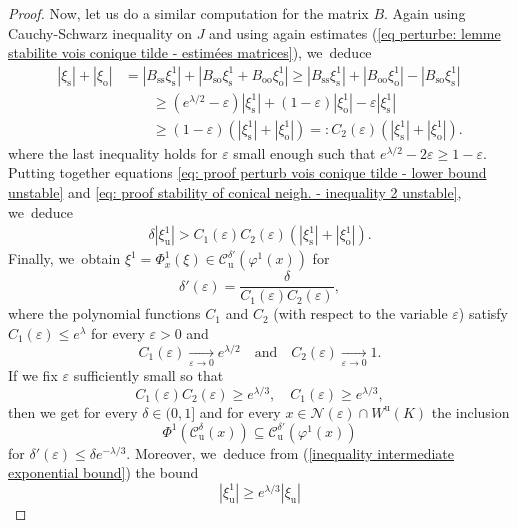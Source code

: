\documentclass[11pt]{article}
\newcommand{\ro}{\mathrm{o}}
\newcommand{\rs}{\mathrm{s}}
\newcommand{\rso}{\mathrm{so}}
\newcommand{\ru}{\mathrm{u}}
\theoremstyle{definition}
\theoremstyle{plain}
\newcommand{\Ccal}{\mathcal{C}}
\newcommand{\Ncal}{\mathcal{N}}
\begin{document}
\begin{proof}
Now, let us do a similar computation for the matrix $B$.
Again using Cauchy-Schwarz inequality on $J$ and using again estimates (\ref{eq perturbe: lemme stabilite vois conique tilde - estimées matrices}), we~deduce
\begin{equation}\label{eq: proof stability of conical neigh. - inequality 2 unstable}
\begin{split}
|\xi_\rs| + |\xi_\ro| &= | B_{\rs\rs} \xi_\rs^1 | + |B_{\rso} \xi_\rs^1 + B_{\ro\ro} \xi_\ro^1 | \geq |B_{\rs\rs} \xi_\rs^1| + |B_{\ro\ro} \xi_\ro^1| - |B_{\rso} \xi_\rs^1| \\
&\qquad \geq (e^{\lambda/2} -\varepsilon) |\xi_\rs^1| + (1 - \varepsilon)|\xi_\ro^1| - \varepsilon |\xi_\rs^1| \\
&\qquad \geq (1 - \varepsilon)(|\xi_\rs^1| + |\xi_\ro^1|) =: C_2 (\varepsilon) (|\xi_\rs^1| + |\xi_\ro^1|).
\end{split}
\end{equation}
where the last inequality holds for $\varepsilon$ small enough such that $e^{\lambda/2} - 2 \varepsilon \geq 1 - \varepsilon$.
Putting together equations \eqref{eq: proof perturb vois conique tilde - lower bound unstable} and \eqref{eq: proof stability of conical neigh. - inequality 2 unstable}, we~deduce
\begin{align*}
\delta|\xi_\ru^1| > C_1 (\varepsilon) C_2 (\varepsilon) (|\xi_\rs^1| + |\xi_\ro^1|).
\end{align*}
Finally, we~obtain $\xi^1 = \Phi_x^1 (\xi) \in \Ccal_\ru^{\delta'}(\varphi^1 (x))$ for
\[
\delta'(\varepsilon) = \frac{\delta }{C_1 (\varepsilon) C_2 (\varepsilon)},
\]
where the polynomial functions $C_1$ and $C_2$ (with respect to the variable $\varepsilon$) satisfy $C_1 (\varepsilon) \leq e^{\lambda}$ for every $\varepsilon >0$ and
\[
C_1 (\varepsilon) \underset{\varepsilon \to 0}{\to} e^{\lambda/2} \quad\text{and}\quad C_2 (\varepsilon) \underset{\varepsilon\to 0}{\to} 1.
\]
If we fix $\varepsilon$ sufficiently small so that
\begin{equation}\label{eq: proof big lemma - estimates C1 C2}
C_1 (\varepsilon) C_2 (\varepsilon) \geq e^{\lambda/3}, \quad C_1 (\varepsilon) \geq e^{\lambda/3},
\end{equation}
then we get for every $\delta\in(0,1]$ and for every $x \in \Ncal (\varepsilon)\cap W^\ru(K)$ the inclusion
\[
\Phi^{1}\left(\Ccal_{\ru}^{\delta}(x)\right) \subseteq \Ccal_{\ru}^{\delta'}(\varphi^{1}(x))
\]
for $\delta'(\varepsilon) \leq \delta e^{-\lambda/3}$. Moreover, we~deduce from (\ref{inequality intermediate exponential bound}) the bound
\begin{equation}\label{inequality intermediate exponential bound 2}
|\xi_\ru^{1}| \geq e^{\lambda/3} |\xi_\ru|
\end{equation}


\end{proof}
\end{document}
